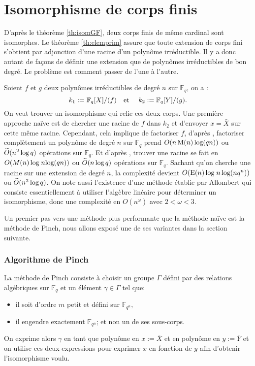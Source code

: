 \documentclass[a4paper]{article} %
\numberwithin{section}{part}
\numberwithin{equation}{section}
\newcommand\GF[1]{\mathbb{F}_{#1}}
\newcommand\etmath{\textup{\quad et \quad}}
\newcommand\M[1]{\textup{M}(#1)}
\newcommand\E[1]{\textup{E}(#1)}
\newcommand\tO[1]{\widetilde{O}(#1)}
\begin{document}
\part{Isomorphisme de corps finis}
\label{deux}
D'après le théorème \ref{th:isomGF}, deux corps finis de même cardinal sont
isomorphes. Le théorème \ref{th:elemprim} assure que toute extension de corps 
fini s'obtient par adjonction d'une racine d'un polynôme irréductible. Il y
a donc autant de façons de définir une extension que de polynômes 
irréductibles de bon degré. Le problème est comment passer de l'une à 
l'autre.\par
Soient $f$ et $g$ deux polynômes irréductibles de degré $n$ sur $\GF{q}$, on a :
\begin{equation}
k_1 := \GF{q}[X]/(f) \etmath k_2 := \GF{q}[Y]/(g). 
\end{equation}
On veut trouver un isomorphisme qui relie ces deux corps. Une première approche 
naïve est de chercher une racine de $f$ dans $k_2$ et d'envoyer $x = \bar{X}$ 
sur cette même racine. Cependant, cela implique de factoriser $f$, d'après 
\cite[th. 14.14]{GaGe}, factoriser complètement un polynôme de degré $n$ sur 
$\GF{q}$ prend $O(n\,\M{n}\,\textup{log}(qn))$ ou $\tO{n^2\,\textup{log\,}q}$
opérations sur $\GF{q}$. Et d'après \cite[cor. 14.16]{GaGe}, trouver une racine 
se fait en $O(M(n)\,\textup{log\;}n\textup{log}(qn))$ ou 
$\tO{n\,\textup{log\,}q}$ opérations sur $\GF{q}$. Sachant qu'on cherche une 
racine sur une extension de degré $n$, la complexité devient 
$O(\E{n}\,\textup{log\;}n\,\textup{log}(nq^n))$ ou $\tO{n^2\,\textup{log\,}q}$.
On note aussi l'existence d'une méthode établie par Allombert\cite{All} qui 
consiste essentiellement à utiliser l'algèbre linéaire pour déterminer un
isomorphisme, donc une complexité en $O(n^{\omega})$ avec $2<\omega<3$.\par
Un premier pas vers une méthode plus performante que la méthode naïve est la 
méthode de Pinch, nous allons exposé une de ses variantes dans la section 
suivante.

\section{Algorithme de Pinch}
La méthode de Pinch consiste à choisir un groupe $\Gamma$ défini par des 
relations algébriques sur $\GF{q}$ et un élément $\gamma\in\Gamma$ tel que:
\vspace{0.3cm}
\begin{itemize}
\item il soit d'ordre $m$ petit et défini sur $\GF{q^n}$,
\item il engendre exactement $\GF{q^n}$; et non un de ses sous-corps.
\end{itemize}
\vspace{0.3cm}
On exprime alors $\gamma$ en tant que polynôme en $x := \overline{X}$ et en 
polynôme en $y := \overline{Y}$ et on utilise ces deux expressions pour exprimer
$x$ en fonction de $y$ afin d'obtenir l'isomorphisme voulu.\par
\end{document}
